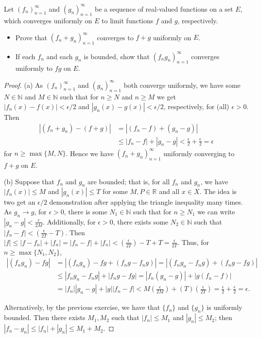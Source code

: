 \documentclass[oneside]{amsart}
\theoremstyle{definition}
\newcommand{\rr}{\mathbb R}
\newcommand{\nn}{\mathbb N}
\begin{document}
\begin{tcolorbox}[colback=black!5!white,colframe=black!75!black,title= Exercise $3.2.$] Let $(f_n)_{n=1}^\infty$ and $(g_n)_{n=1}^\infty$ be a sequence of real-valued functions on a set $E$, which converges uniformly on $E$ to limit functions $f$ and $g$, respectively. 
\begin{itemize}
	\item [(a)] Prove that $(f_n+g_n)_{n=1}^\infty$ converges to $f+g$ uniformly on $E$.
	\item [(b)] If each $f_n$ and each $g_n$ is bounded, show that $(f_n g_n)_{n=1}^\infty$ converges uniformly to $fg$ on $E$.
\end{itemize}
\tcblower 
\begin{proof} (a) As $(f_n)_{n=1}^\infty$ and $(g_n)^\infty_{n=1}$ both converge uniformly, we have some $N \in \nn$ and $M \in \nn$ such that for $n \geq N$ and $n \geq M$ we get $ |f_n(x) -f(x)| < \epsilon/2$ and $|g_n(x) - g(x)| < \epsilon/2$, respectively,  for (all) $\epsilon > 0$. Then 
\begin{align*}
|(f_n+g_n)-(f+g)| &= |(f_n-f)+(g_n-g)| \\ &\leq |f_n-f| + |g_n-g| < \frac{\epsilon}{2} + \frac{\epsilon}{2} = \epsilon
\end{align*}
for $ n \geq \max \{M,N\}$. Hence we have $(f_n+g_n)_{n=1}^\infty$ uniformly converging to $f+g$ on $E$.

(b) Suppose that $f_n$ and $g_n$ are bounded; that is, for all $f_n$ and $g_n$, we have $|f_n(x) | \leq M$ and $|g_n(x)| \leq T$ for some $M,P \in \rr$ and all $x \in X$. The idea is two get an $\epsilon/2$ demonstration after applying the triangle inequality many times. As $g_n \to g$, for $\epsilon>0$, there is some $N_1 \in \nn$ such that for $n \geq N_1$ we can write $|g_n-g| < \frac{\epsilon}{2M}$. Additionally, for $\epsilon >0$, there exists some $N_2 \in \nn$ such that $|f_n - f| < (\frac{\epsilon}{2T}-T)$. Then $|f| \leq |f-f_n| + |f_n| = |f_n -f|+|f_n| < (\frac{\epsilon}{2T}) -T+T = \frac{\epsilon}{2T}$. Thus, for $n \geq \max \{N_1, N_2\}$,
\begin{align*}
	|(f_ng_n) -fg| & = |(f_n g_n) - fg + (f_n g- f_ng)| = |(f_ng_n-f_ng)+(f_ng-fg)| \\
	&\leq |f_ng_n-f_ng|+|f_n g-fg| = |f_n (g_n-g)|+|g(f_n-f)| \\
	&= |f_n||g_n-g| + |g||f_n-f| < M \left( \frac{\epsilon}{2M} \right) + (T)\left (\frac{\epsilon}{2T} \right ) = \frac{\epsilon}{2} + \frac{\epsilon}{2} = \epsilon.
\end{align*}

Alternatively, by the previous exercise, we have that $\{f_n \}$ and $\{g_n \}$ is uniformly bounded. Then there exists $M_1, M_2$ such that $|f_n| \leq M_1$ and $|g_n | \leq M_2$; then $ |f_n - g_n| \leq |f_n|+ |g_n| \leq M_1 + M_2$.
\end{proof}
\end{tcolorbox}
\end{document}
